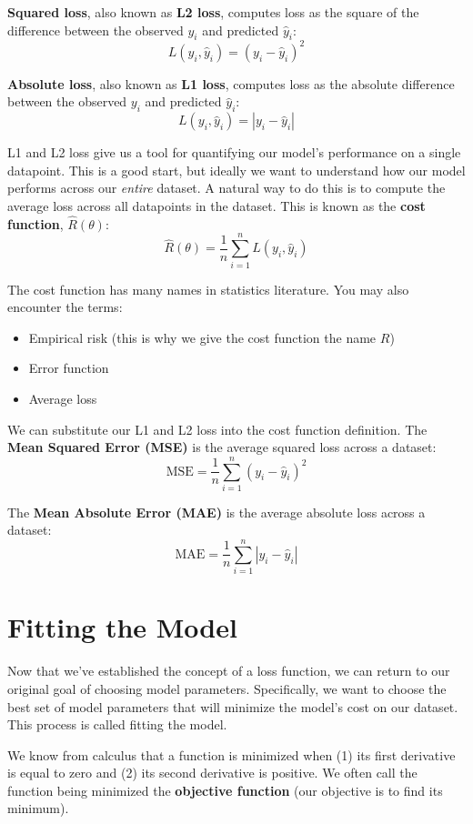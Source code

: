 \documentclass[
  letterpaper,
  DIV=11,
  numbers=noendperiod]{scrreprt}
\providecommand{\tightlist}{%
  \setlength{\itemsep}{0pt}\setlength{\parskip}{0pt}}\usepackage{longtable,booktabs,array}
\begin{document}
\textbf{Squared loss}, also known as \textbf{L2 loss}, computes loss as
the square of the difference between the observed \(y_i\) and predicted
\(\hat{y}_i\): \[L(y_i, \hat{y}_i) = (y_i - \hat{y}_i)^2\]

\textbf{Absolute loss}, also known as \textbf{L1 loss}, computes loss as
the absolute difference between the observed \(y_i\) and predicted
\(\hat{y}_i\): \[L(y_i, \hat{y}_i) = |y_i - \hat{y}_i|\]

L1 and L2 loss give us a tool for quantifying our model's performance on
a single datapoint. This is a good start, but ideally we want to
understand how our model performs across our \emph{entire} dataset. A
natural way to do this is to compute the average loss across all
datapoints in the dataset. This is known as the \textbf{cost function},
\(\hat{R}(\theta)\):
\[\hat{R}(\theta) = \frac{1}{n} \sum^n_{i=1} L(y_i, \hat{y}_i)\]

The cost function has many names in statistics literature. You may also
encounter the terms:

\begin{itemize}
\tightlist
\item
  Empirical risk (this is why we give the cost function the name \(R\))
\item
  Error function
\item
  Average loss
\end{itemize}

We can substitute our L1 and L2 loss into the cost function definition.
The \textbf{Mean Squared Error (MSE)} is the average squared loss across
a dataset: \[\text{MSE} = \frac{1}{n} \sum_{i=1}^n (y_i - \hat{y}_i)^2\]

The \textbf{Mean Absolute Error (MAE)} is the average absolute loss
across a dataset:
\[\text{MAE}= \frac{1}{n} \sum_{i=1}^n |y_i - \hat{y}_i|\]

\hypertarget{fitting-the-model}{%
\section{Fitting the Model}\label{fitting-the-model}}

Now that we've established the concept of a loss function, we can return
to our original goal of choosing model parameters. Specifically, we want
to choose the best set of model parameters that will minimize the
model's cost on our dataset. This process is called fitting the model.

We know from calculus that a function is minimized when (1) its first
derivative is equal to zero and (2) its second derivative is positive.
We often call the function being minimized the \textbf{objective
function} (our objective is to find its minimum).
\end{document}
